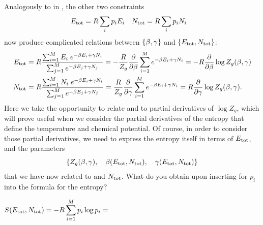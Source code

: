 Analogously to  in , the other two constraints
\begin{align*}
  E_{\text{tot}} & = R \sum_i p_i E_i &
  N_{\text{tot}} & = R \sum_i p_i N_i
\end{align*}
now produce complicated relations between $\left\{\beta, \gamma\right\}$ and $\left\{E_{\text{tot}}, N_{\text{tot}}\right\}$:
\begin{align}
  E_{\text{tot}} & = R \frac{\sum_{i = 1}^M E_i \; e^{-\beta E_i + \gamma N_i}}{\sum_{j = 1}^M e^{-\beta E_j + \gamma N_j}} = -\frac{R}{Z_g} \frac{\partial }{\partial \beta} \sum_{i = 1}^M e^{-\beta E_i + \gamma N_i} = -R \frac{\partial }{\partial \beta} \log Z_g(\beta, \gamma) \label{eq:grand_be_deriv} \\
  N_{\text{tot}} & = R \frac{\sum_{i = 1}^M N_i \; e^{-\beta E_i + \gamma N_i}}{\sum_{j = 1}^M e^{-\beta E_j + \gamma N_j}} =  \frac{R}{Z_g} \frac{\partial }{\partial \gamma} \sum_{i = 1}^M e^{-\beta E_i + \gamma N_i} =  R \frac{\partial }{\partial \gamma} \log Z_g(\beta, \gamma). \label{eq:grand_ga_deriv}
\end{align}
Here we take the opportunity to relate \Etot and \Ntot to partial derivatives of $\log Z_g$, which will prove useful when we consider the partial derivatives of the entropy that define the temperature and chemical potential.
Of course, in order to consider those partial derivatives, we need to express the entropy itself in terms of $E_{\text{tot}}$, \Ntot and the parameters
\begin{equation*}
  \left\{Z_g(\beta, \gamma), \quad \beta(E_{\text{tot}}, N_{\text{tot}}), \quad \gamma(E_{\text{tot}}, N_{\text{tot}})\right\}
\end{equation*}
that we have now related to \Etot and $N_{\text{tot}}$.
What do you obtain upon inserting  for $p_i$ into the formula for the entropy?
\begin{mdframed}
  $\displaystyle S(E_{\text{tot}}, N_{\text{tot}}) = -R \sum_{i = 1}^M p_i \log p_i = $ \\[75 pt] %
\end{mdframed}

